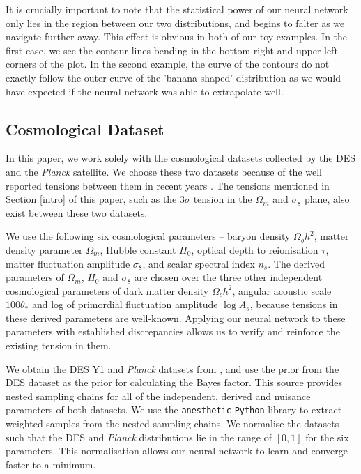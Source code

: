 \documentclass[%
 reprint,
 amsmath,amssymb,
 aps,
]{revtex4-2}
\begin{document}
It is crucially important to note that the statistical power of our neural network only lies in the region between our two distributions, and begins to falter as we navigate further away. This effect is obvious in both of our toy examples. In the first case, we see the contour lines bending in the bottom-right and upper-left corners of the plot. In the second example, the curve of the contours do not exactly follow the outer curve of the 'banana-shaped' distribution as we would have expected if the neural network was able to extrapolate well.


\subsection{Cosmological Dataset}

In this paper, we work solely with the cosmological datasets collected by the DES and the \textit{Planck} satellite. We choose these two datasets because of the well reported tensions between them in recent years \cite{Handley2019, Lemos2020}. The tensions mentioned in Section \ref{intro} of this paper, such as the $3\sigma$ tension in the $\Omega_m$ and $\sigma_8$ plane, also exist between these two datasets.

We use the following six cosmological parameters -- baryon density $\Omega_b h^2$, matter density parameter $\Omega_m$, Hubble constant $H_0$, optical depth to reionisation $\tau$, matter fluctuation amplitude $\sigma_8$, and scalar spectral index $n_s$. The derived parameters of $\Omega_m$, $H_0$ and $\sigma_8$ are chosen over the three other independent cosmological parameters of dark matter density $\Omega_c h^2$, angular acoustic scale $100 \theta_*$ and log of primordial fluctuation amplitude $\log A_s$,  because tensions in these derived parameters are well-known. Applying our neural network to these parameters with established discrepancies allows us to verify and reinforce the existing tension in them.

We obtain the DES Y1 and \textit{Planck} datasets from \cite{Dataset}, and use the prior from the DES dataset as the prior for calculating the Bayes factor. This source provides nested sampling chains for all of the independent, derived and nuisance parameters of both datasets. We use the \texttt{anesthetic} \texttt{Python} library \cite{anesthetic} to extract weighted samples from the nested sampling chains. We normalise the datasets such that the DES and \textit{Planck} distributions lie in the range of $[0, 1]$ for the six parameters. This normalisation allows our neural network to learn and converge faster to a minimum.
\end{document}

